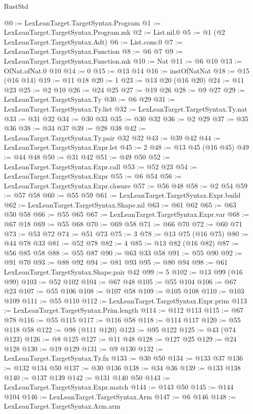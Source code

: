 \begin{lexlean}{RustStd}
\begin{coremodule}
@0 := LexLeanTarget.TargetSyntax.Program
@1 := LexLeanTarget.TargetSyntax.Program.mk
@2 := List.nil.{0}
@5 := @1 (@2 LexLeanTarget.TargetSyntax.Adt)
@6 := List.cons.{0}
@7 := LexLeanTarget.TargetSyntax.Function
@8 := @6 @7
@9 := LexLeanTarget.TargetSyntax.Function.mk
@10 := Nat
@11 := @6 @10
@13 := OfNat.ofNat.{0} @10
@14 := 0
@15 := @13 @14
@16 := instOfNatNat
@18 := @15 (@16 @14)
@19 := @11 @18
@20 := 1
@23 := @13 @20 (@16 @20)
@24 := @11 @23
@25 := @2 @10
@26 := @24 @25
@27 := @19 @26
@28 := @9 @27
@29 := LexLeanTarget.TargetSyntax.Ty
@30 := @6 @29
@31 := LexLeanTarget.TargetSyntax.Ty.list
@32 := LexLeanTarget.TargetSyntax.Ty.nat
@33 := @31 @32
@34 := @30 @33
@35 := @30 @32
@36 := @2 @29
@37 := @35 @36
@38 := @34 @37
@39 := @28 @38
@42 := LexLeanTarget.TargetSyntax.Ty.pair @32 @32
@43 := @39 @42
@44 := LexLeanTarget.TargetSyntax.Expr.let
@45 := 2
@48 := @13 @45 (@16 @45)
@49 := @44 @48
@50 := @31 @42
@51 := @49 @50
@52 := LexLeanTarget.TargetSyntax.Expr.call
@53 := @52 @23
@54 := LexLeanTarget.TargetSyntax.Expr
@55 := @6 @54
@56 := LexLeanTarget.TargetSyntax.Expr.closure
@57 := @56 @48
@58 := @2 @54
@59 := @57 @58
@60 := @55 @59
@61 := LexLeanTarget.TargetSyntax.Expr.build
@62 := LexLeanTarget.TargetSyntax.Shape.nil
@63 := @61 @62
@65 := @63 @50 @58
@66 := @55 @65
@67 := LexLeanTarget.TargetSyntax.Expr.var
@68 := @67 @18
@69 := @55 @68
@70 := @69 @58
@71 := @66 @70
@72 := @60 @71
@73 := @53 @72
@74 := @51 @73
@75 := 3
@78 := @13 @75 (@16 @75)
@80 := @44 @78 @33
@81 := @52 @78
@82 := 4
@85 := @13 @82 (@16 @82)
@87 := @56 @85 @58
@88 := @55 @87
@90 := @63 @33 @58
@91 := @55 @90
@92 := @91 @70
@93 := @88 @92
@94 := @81 @93
@95 := @80 @94
@98 := @61 LexLeanTarget.TargetSyntax.Shape.pair @42
@99 := 5
@102 := @13 @99 (@16 @99)
@103 := @52 @102
@104 := @67 @48
@105 := @55 @104
@106 := @67 @23
@107 := @55 @106
@108 := @107 @58
@109 := @105 @108
@110 := @103 @109
@111 := @55 @110
@112 := LexLeanTarget.TargetSyntax.Expr.prim
@113 := LexLeanTarget.TargetSyntax.Prim.length
@114 := @112 @113
@115 := @67 @78
@116 := @55 @115
@117 := @116 @58
@118 := @114 @117
@120 := @55 @118 @58
@122 := @98 (@111 @120)
@123 := @95 @122
@125 := @43 (@74 @123)
@126 := @8 @125
@127 := @11 @48
@128 := @127 @25
@129 := @24 @128
@130 := @19 @129
@131 := @9 @130
@132 := LexLeanTarget.TargetSyntax.Ty.fn
@133 := @30 @50
@134 := @133 @37
@136 := @132 @134 @50
@137 := @30 @136
@138 := @34 @36
@139 := @133 @138
@140 := @137 @139
@142 := @131 @140 @50
@143 := LexLeanTarget.TargetSyntax.Expr.match
@144 := @143 @50
@145 := @144 @104
@146 := LexLeanTarget.TargetSyntax.Arm
@147 := @6 @146
@148 := LexLeanTarget.TargetSyntax.Arm.arm

\end{coremodule}
\end{lexlean}

